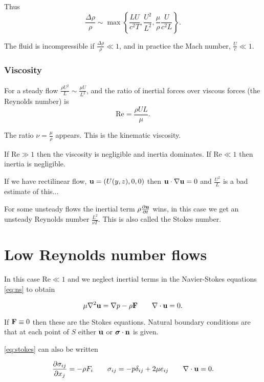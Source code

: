 \documentclass{notes}
\newcommand{\Rey}{\mathrm{Re}}
\newcommand{\bs}{\boldsymbol{\sigma}}
\theoremstyle{plain}
\begin{document}
Thus
\[
\frac{\Delta \rho}{\rho} \sim \max \left\{ \frac{L U}{c^2 T},
\frac{U^2}{L^2}, \frac{\mu}{\rho} \frac{U}{c^2 L}
\right\}.
\]

The fluid is incompressible if $\frac{\Delta \rho}{\rho} \ll 1$,
and in practice the Mach number, $\frac{U}{c} \ll 1$.

\subsection{Viscosity}

For a steady flow $\frac{\rho U^2}{L} \sim \frac{\mu U}{L^2}$,
and the ratio of inertial forces over viscous forces (the Reynolds number)
is
\[
\Rey = \frac{\rho U L}{\mu}.
\]

The ratio $\nu = \frac{\mu}{\rho}$ appears.  This is the kinematic viscosity.

If $\Rey \gg 1$ then the viscosity is negligible and inertia dominates. If
$\Rey \ll 1$ then inertia is negligible.

If we have rectilinear flow, $\mathbf{u} = (U(y,z),0,0)$ then $\mathbf{u} \cdot \nabla \mathbf{u}
= 0$ and $\frac{U^2}{L}$ is a bad estimate of this...

For some unsteady flows the inertial term $\rho \frac{\partial \mathbf{u}}{\partial t}$ wins,
in this case we get an unsteady Reynolds number $\frac{L^2}{\nu T}$.  This
is also called the Stokes number.

\chapter{Low Reynolds number flows}\label{chap:stokes}

In this case $\Rey \ll 1$ and we neglect inertial terms in the
Navier-Stokes equations \eqref{eq:ns} to obtain

\begin{equation}\label{eq:stokes}
\mu \nabla^2 \mathbf{u} = \nabla p - \rho \mathbf{F} \qquad \nabla \cdot \mathbf{u} = 0.
\end{equation}

If $\mathbf{F} \equiv 0$ then these are the Stokes equations.  Natural
boundary conditions are that at each point of $S$ either $\mathbf{u}$ or
$\bs \cdot \vn$ is given.

\eqref{eq:stokes} can also be written

\begin{equation} \label{eq:stokes2}
\frac{\partial \sigma_{i j}}{\partial x_j} = - \rho F_i \qquad \sigma_{i j} = - p \delta_{i j}
+ 2 \mu e_{i j} \qquad \nabla \cdot \mathbf{u} = 0.
\end{equation}
\end{document}
